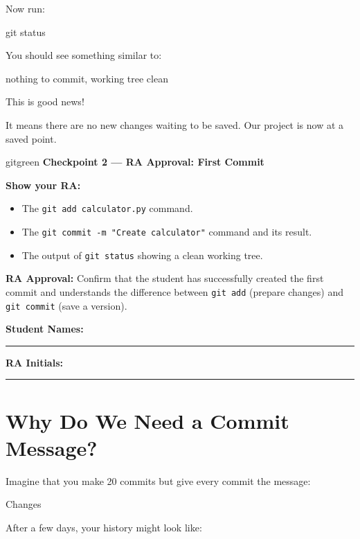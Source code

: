 \documentclass[11pt,a4paper]{article}
\begin{document}
Now run:

\begin{code}
git status
\end{code}

You should see something similar to:

\begin{code}
nothing to commit, working tree clean
\end{code}

This is good news!

It means there are no new changes waiting to be saved. Our project is now at a saved point.

\begin{checkpoint}{gitgreen}
\textbf{Checkpoint 2 --- RA Approval: First Commit}

\textbf{Show your RA:}

\begin{itemize}
    \item The \texttt{git add calculator.py} command.
    \item The \texttt{git commit -m "Create calculator"} command and its result.
    \item The output of \texttt{git status} showing a clean working tree.
\end{itemize}

\textbf{RA Approval:} Confirm that the student has successfully created the first commit and understands the difference between \texttt{git add} (prepare changes) and \texttt{git commit} (save a version).

\vspace{0.5em}

\textbf{Student Names:} \rule{5cm}{0.4pt} \textbf{RA Initials:} \rule{3cm}{0.4pt}
\end{checkpoint}

\section{Why Do We Need a Commit Message?}

Imagine that you make 20 commits but give every commit the message:

\begin{code}
Changes
\end{code}

After a few days, your history might look like:
\end{document}
